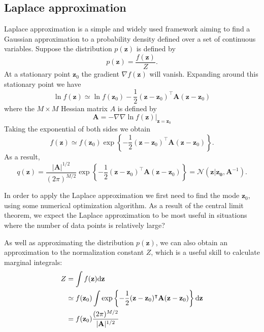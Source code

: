 \documentclass[a4paper]{report}
\newcommand{\ud}{\mathrm{d}}
\renewcommand{\bf}{\mathbf}
\renewcommand{\cal}{\mathcal}
\begin{document}
\subsection{Laplace approximation}
Laplace approximation is a simple and widely used framework aiming to find a Gaussian approximation to a probability density defined over a set of continuous variables. Suppose the distribution $p(\bf{z})$ is defined by
\begin{equation}
	p(\bf{z}) = \frac{f(\bf{z})}{Z}.
\end{equation}
At a stationary point $\bf{z}_0$ the gradient $\nabla f(\bf{z})$ will vanish. Expanding around this stationary point we have
\begin{equation}
	\ln f(\bf{z}) \simeq \ln f(\bf{z}_0) - \frac{1}{2}(\bf{z-z}_0)^{\intercal} \bf{A}(\bf{z-z}_0)
\end{equation}
where the $M \times M$ Hessian matrix $A$ is defined by
\begin{equation}
	\bf{A} = -\nabla \nabla \ln f(\bf{z})|_{\bf{z=z}_0}
\end{equation}
Taking the exponential of both sides we obtain
\begin{equation}
	f(\bf{z}) \simeq f(\bf{z}_0) \exp \left\{ -\frac{1}{2} (\bf{z-z}_0)^{\intercal} \bf{A} (\bf{z-z}_0) \right\}.
\end{equation}
As a result,
\begin{equation}
	q(\bf{z}) = \frac{|\bf{A}|^{1/2}}{(2\pi)^{M/2}} \exp \left\{ -\frac{1}{2} (\bf{z-z}_0)^{\intercal} \bf{A} (\bf{z-z}_0) \right\} =\cal{N}(\bf{z|z_0},\bf{A}^{-1}).
\end{equation}

In order to apply the Laplace approximation we first need to find the mode $\bf{z}_0$, using some numerical optimization algorithm. As a result of the central limit theorem, we expect the Laplace approximation to be most useful in situations where the number of data points is relatively large?

As well as approximating the distribution $p(\bf{z})$, we can also obtain an approximation to the normalization constant $Z$, which is a useful skill to calculate marginal integrals:
\begin{align}
	Z &= \int f(\bf{z}) \ud \bf{z } \notag \\
	&\simeq f(\bf{z}_0) \int \exp \left\{ -\frac{1}{2} (\bf{z-z}_0)^{\intercal} \bf{A} (\bf{z-z}_0) \right\} \ud \bf{z} \notag\\
	&= f(\bf{z}_0) \frac{(2\pi)^{M/2}}{|\bf{A}|^{1/2}} \label{LapInt}
\end{align}
\end{document}
